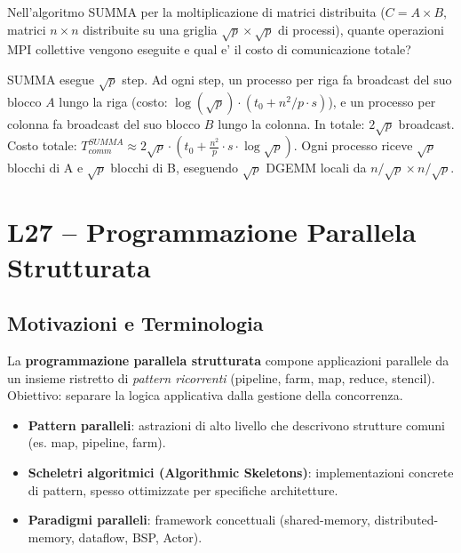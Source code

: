 \documentclass[11pt,a4paper]{article}
\theoremstyle{remark}
\newenvironment{esercizio}[1][]{%
  \begin{tcolorbox}[breakable,title={\textbf{Esercizio / Domanda d'esame}\ifx&#1&\else: #1\fi},
    colback=yellow!5!white, colframe=orange!75!black, fonttitle=\small\bfseries]%
}{%
  \end{tcolorbox}%
}
\newenvironment{risposta}{%
  \begin{tcolorbox}[breakable,title={\textbf{Risposta}},
    colback=green!5!white, colframe=green!50!black, fonttitle=\small\bfseries]%
}{%
  \end{tcolorbox}%
}
\begin{document}
\begin{esercizio}
Nell'algoritmo SUMMA per la moltiplicazione di matrici distribuita ($C = A \times B$, matrici $n\times n$ distribuite su una griglia $\sqrt{p} \times \sqrt{p}$ di processi), quante operazioni MPI collettive vengono eseguite e qual e' il costo di comunicazione totale?
\end{esercizio}
\begin{risposta}
SUMMA esegue $\sqrt{p}$ step. Ad ogni step, un processo per riga fa broadcast del suo blocco $A$ lungo la riga (costo: $\log(\sqrt{p}) \cdot (t_0 + n^2/p \cdot s)$), e un processo per colonna fa broadcast del suo blocco $B$ lungo la colonna. In totale: $2\sqrt{p}$ broadcast. Costo totale:
$T_{comm}^{SUMMA} \approx 2\sqrt{p} \cdot (t_0 + \frac{n^2}{p} \cdot s \cdot \log\sqrt{p})$.
Ogni processo riceve $\sqrt{p}$ blocchi di A e $\sqrt{p}$ blocchi di B, eseguendo $\sqrt{p}$ DGEMM locali da $n/\sqrt{p} \times n/\sqrt{p}$.
\end{risposta}

\section{L27 -- Programmazione Parallela Strutturata}

\subsection{Motivazioni e Terminologia}

La \textbf{programmazione parallela strutturata} compone applicazioni parallele da un insieme ristretto di \emph{pattern ricorrenti} (pipeline, farm, map, reduce, stencil). Obiettivo: separare la logica applicativa dalla gestione della concorrenza.

\begin{itemize}
  \item \textbf{Pattern paralleli}: astrazioni di alto livello che descrivono strutture comuni (es. map, pipeline, farm).
  \item \textbf{Scheletri algoritmici (Algorithmic Skeletons)}: implementazioni concrete di pattern, spesso ottimizzate per specifiche architetture.
  \item \textbf{Paradigmi paralleli}: framework concettuali (shared-memory, distributed-memory, dataflow, BSP, Actor).
\end{itemize}
\end{document}
